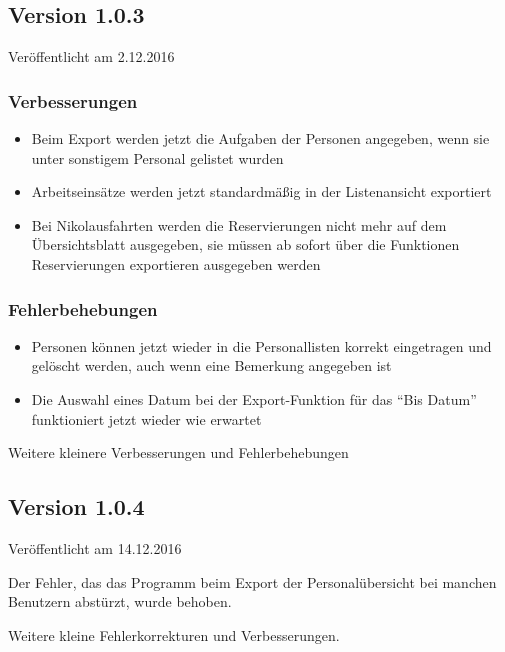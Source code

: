 \subsection{Version 1.0.3}
\label{version:1:0:3}
Veröffentlicht am 2.12.2016
\subsubsection{Verbesserungen}
\begin{itemize}
  \item
  Beim Export werden jetzt die Aufgaben der Personen angegeben, wenn sie unter sonstigem Personal gelistet wurden
  \item
  Arbeitseinsätze werden jetzt standardmäßig in der Listenansicht exportiert
  \item
  Bei Nikolausfahrten werden die Reservierungen nicht mehr auf dem Übersichtsblatt ausgegeben, sie müssen ab sofort über die Funktionen Reservierungen exportieren ausgegeben werden
\end{itemize}

\subsubsection{Fehlerbehebungen}
\begin{itemize}
  \item
  Personen können jetzt wieder in die Personallisten korrekt eingetragen und gelöscht werden, auch wenn eine Bemerkung angegeben ist
  \item
  Die Auswahl eines Datum bei der Export-Funktion für das "`Bis Datum"' funktioniert jetzt wieder wie erwartet
\end{itemize}
Weitere kleinere Verbesserungen und Fehlerbehebungen


\subsection{Version 1.0.4}
\label{version:1:0:4}
Veröffentlicht am 14.12.2016

Der Fehler, das das Programm beim Export der Personalübersicht bei manchen Benutzern abstürzt, wurde behoben.

Weitere kleine Fehlerkorrekturen und Verbesserungen.
